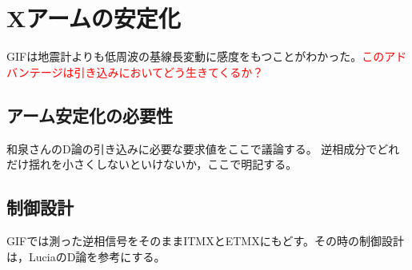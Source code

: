 \section{Xアームの安定化}
GIFは地震計よりも低周波の基線長変動に感度をもつことがわかった。\textcolor{red}{このアドバンテージは引き込みにおいてどう生きてくるか？}

\subsection{アーム安定化の必要性}

和泉さんのD論の引き込みに必要な要求値をここで議論する。
逆相成分でどれだけ揺れを小さくしないといけないか，ここで明記する。


\subsection{制御設計}

GIFでは測った逆相信号をそのままITMXとETMXにもどす。その時の制御設計は，LuciaのD論を参考にする。




